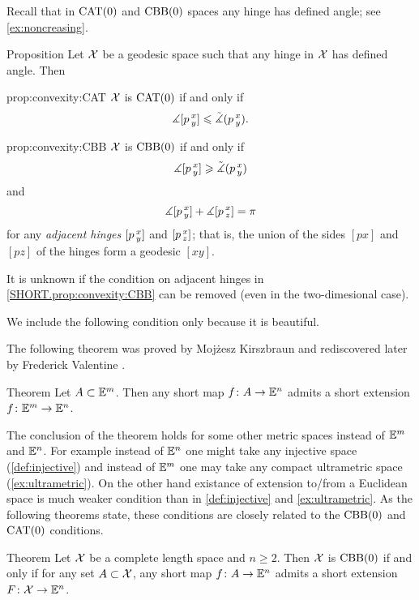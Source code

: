 Recall that in $\mathrm{CAT}(0)$ and $\mathrm{CBB}(0)$ spaces any hinge has defined angle; see \ref{ex:noncreasing}.

\begin{thm}{Proposition}\label{prop:convexity}
Let $\mathcal{X}$ be a geodesic space such that any hinge in $\mathcal{X}$ has defined angle.
Then 

\begin{subthm}{prop:convexity:CAT}
$\mathcal{X}$ is $\mathrm{CAT}(0)$ if and only if 
\[\measuredangle[p\,{}^{x}_{y}]\leqslant \tilde\measuredangle(p\,{}^{x}_{y}).\]
\end{subthm}

\begin{subthm}{prop:convexity:CBB}
$\mathcal{X}$ is $\mathrm{CBB}(0)$ if and only if 
\[\measuredangle[p\,{}^{x}_{y}]\geqslant \tilde\measuredangle(p\,{}^{x}_{y})\]
and 
\[\measuredangle[p\,{}^{x}_{y}]+\measuredangle[p\,{}^{x}_{z}]=\pi\]
for any \emph{adjacent hinges} $[p\,{}^{x}_{y}]$ and $[p\,{}^{x}_{z}]$;
that is, the union of the sides $[px]$ and $[pz]$ of the hinges form a geodesic $[xy]$.
\end{subthm}

\end{thm}

It is unknown if the condition on adjacent hinges in \ref{SHORT.prop:convexity:CBB} can be removed (even in the two-dimesional case).

We include the following condition only because it is beautiful.

The following theorem was proved by Mojżesz Kirszbraun \cite{kirszbraun} and rediscovered later by Frederick Valentine \cite{valentine}.

\begin{thm}{Theorem}
Let $A\subset \mathbb{E}^m$.
Then any short map $f\colon A\to \mathbb{E}^n$
admits a short extension $f\colon\mathbb{E}^m\to \mathbb{E}^n$.
\end{thm}

The conclusion of the theorem holds for some other metric spaces instead of $\mathbb{E}^m$ and $\mathbb{E}^n$.
For example instead of $\mathbb{E}^n$ one might take any injective space (\ref{def:injective}) and instead of $\mathbb{E}^m$ one may take any compact ultrametric space (\ref{ex:ultrametric}).
On the other hand existance of extension to/from a Euclidean space is much weaker condition than in \ref{def:injective} and \ref{ex:ultrametric}.
As the following theorems state, these conditions are closely related to the $\mathrm{CBB}(0)$ and $\mathrm{CAT}(0)$ conditions.

\begin{thm}{Theorem}
Let $\mathcal{X}$ be a complete length space and $n\ge 2$.
Then $\mathcal{X}$ is $\mathrm{CBB}(0)$ if and only if for any set $A\subset \mathcal{X}$, 
any short map $f\colon A\to \mathbb{E}^n$ 
admits a short extension $F\colon\mathcal{X}\to \mathbb{E}^n$.
\end{thm}

